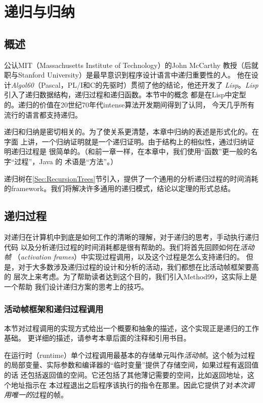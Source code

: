 \chapter{递归与归纳}\label{Sec:Chapter:RecursionAndInduction}
\section{概述}
公认MIT（Massachusetts Institute of Technology）的John McCarthy
教授（后就职与Stanford University）是最早意识到程序设计语言中递归重要性的人。
他在设计\emph{Algol60}（Pascal，PL/I和C的先驱时）贯彻了他的结论，他还开发了
\emph{Lisp}。\emph{Lisp}引入了递归数据结构，递归过程和递归函数。本节中的概念
都是在Lisp中定型的。递归的价值在20世纪70年代intense算法开发期间得到了认同，
今天几乎所有流行的语言都支持递归。

递归和归纳是密切相关的。为了使关系更清楚，本章中归纳的表述是形式化的。在字面
上讲，一个归纳证明就是一个递归证明。由于结构上的相似性，通过归纳证明递归过程是
很简单的。（和前一章一样，在本章中，我们使用“函数”更一般的名字“过程”，Java
的 术语是“方法”。）

递归树在\ref{Sec:RecursionTrees}节引入，提供了一个通用的分析递归过程的时间消耗
的framework。我们将解决许多通用的递归模式，结论以定理的形式总结。

\section{递归过程}
对递归在计算机中到底是如何工作的清晰的理解，对于递归的思考，手动执行递归代码
以及分析递归过程的时间消耗都是很有帮助的。我们将首先回顾如何在\emph{活动帧}
（\emph{activation frames}）中实现过程调用，以及这个过程是怎么支持递归的。
但是，对于大多数涉及递归过程的设计和分析的活动，我们都想在比活动帧框架要高的
层次上来考虑。为了帮助读者达到这个目的，我们引入Method99，这实际上是一个帮助
我们设计递归方案的思考上的技巧。

\subsection{活动帧框架和递归过程调用}\label{Sec:3_2_1}
本节对过程调用的实现方式给出一个概要和抽象的描述，这个实现正是递归的工作基础。
更详细的描述，请参考本章后面的注释和引用书目。

在运行时（runtime）单个过程调用最基本的存储单元叫作\emph{活动帧}。这个帧为过程
的局部变量、实际参数和编译器的“临时变量”提供了存储空间，如果过程有返回值的话
还包括返回值的空间。它还包括了其他薄记需要的空间，比如返回地址，这个地址指示在
本过程退出之后程序该执行的指令在那里。因此它提供了对\emph{本次调用唯一的}过程的帧。

